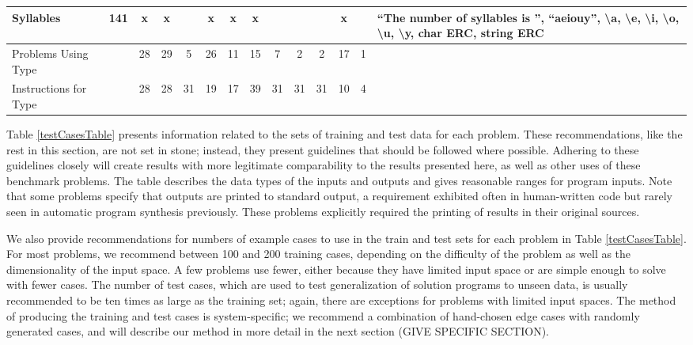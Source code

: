 \documentclass{sig-alternate}
\begin{document}
\begin{table*}
\begin{tabular}{|>{\raggedright}p{3.1cm}|c|ccccccccccc|>{\raggedright}p{5.5cm}|}
\hline
Syllables                  & 141             & x    & x       &       & x       & x    & x      &                    &                  &                   & x     &            & ``The number of syllables is '', ``aeiouy'', \textbackslash a, \textbackslash e, \textbackslash i, \textbackslash o, \textbackslash u, \textbackslash y, char ERC, string ERC                                                   \tabularnewline
\hline
\hline
Problems Using Type                      &                 & 28   & 29      & 5     & 26      & 11   & 15     & 7                  & 2                & 2                 & 17    & 1          &                                                                                                                                                                                                                             \tabularnewline
\hline
Instructions for Type     &                 & 28   & 28      & 31    & 19      & 17   & 39     & 31                 & 31               & 31                & 10    & 4          &                                                                                                                                                                                                                             \tabularnewline
\hline
\end{tabular}
\end{table*}

Table \ref{testCasesTable} presents information related to the sets of training and test data for each problem. These recommendations, like the rest in this section, are not set in stone; instead, they present guidelines that should be followed where possible. Adhering to these guidelines closely will create results with more legitimate comparability to the results presented here, as well as other uses of these benchmark problems. The table describes the data types of the inputs and outputs and gives reasonable ranges for program inputs. Note that some problems specify that outputs are printed to standard output, a requirement exhibited often in human-written code but rarely seen in automatic program synthesis previously. These problems explicitly required the printing of results in their original sources.

We also provide recommendations for numbers of example cases to use in the train and test sets for each problem in Table \ref{testCasesTable}. For most problems, we recommend between 100 and 200 training cases, depending on the difficulty of the problem as well as the dimensionality of the input space. A few problems use fewer, either because they have limited input space or are simple enough to solve with fewer cases. The number of test cases, which are used to test generalization of solution programs to unseen data, is usually recommended to be ten times as large as the training set; again, there are exceptions for problems with limited input spaces. The method of producing the training and test cases is system-specific; we recommend a combination of hand-chosen edge cases with randomly generated cases, and will describe our method in more detail in the next section (GIVE SPECIFIC SECTION).
\end{document}
